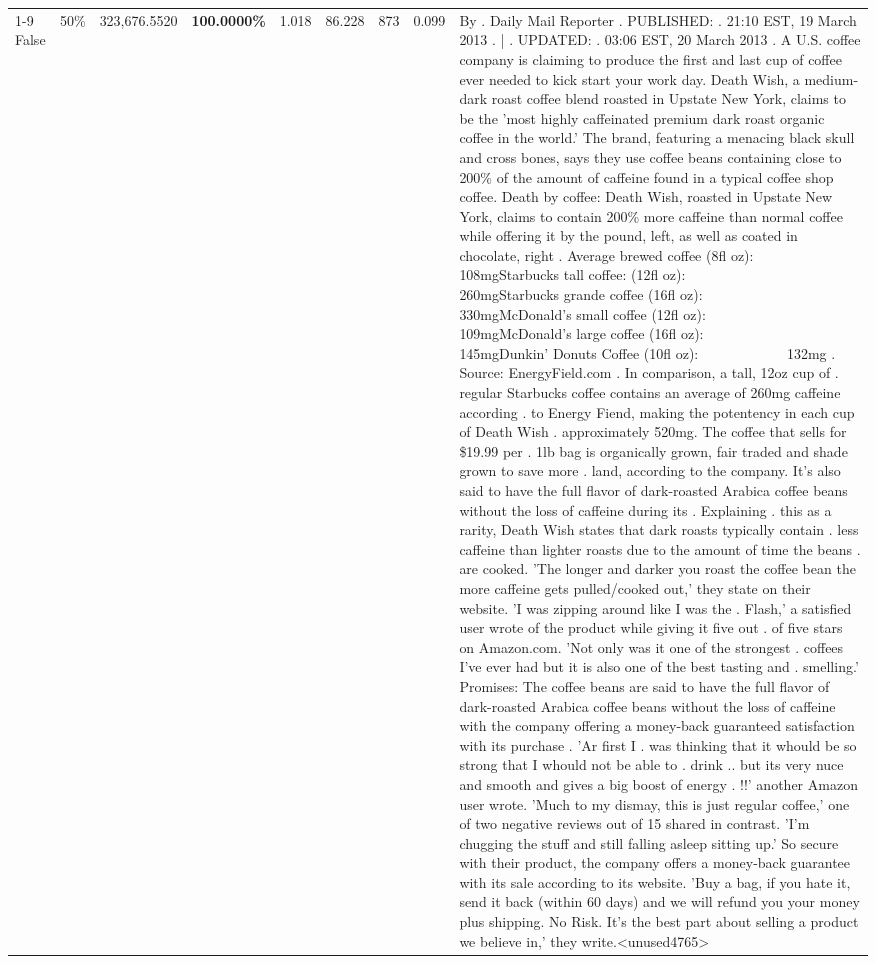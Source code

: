 \begin{table}[H]
{\begin{tabular}{lllrlllll}
\cline{1-9} \cline{2-9}
False & 50\% & 323,676.5520 & \bfseries \color{red} 100.0000\% & 1.018 & 86.228 & 873 & 0.099 & By . Daily Mail Reporter . PUBLISHED: . 21:10 EST, 19 March 2013 . | . UPDATED: . 03:06 EST, 20 March 2013 . A U.S. coffee company is claiming to produce the first and last cup of coffee ever needed to kick start your work day. Death Wish, a medium-dark roast coffee blend roasted in Upstate New York, claims to be the 'most highly caffeinated premium dark roast organic coffee in the world.' The brand, featuring a menacing black skull and cross bones, says they use coffee beans containing close to 200\% of the amount of caffeine found in a typical coffee shop coffee. Death by coffee: Death Wish, roasted in Upstate New York, claims to contain 200\% more caffeine than normal coffee while offering it by the pound, left, as well as coated in chocolate, right . Average brewed coffee (8fl oz):              108mgStarbucks tall coffee: (12fl oz):                260mgStarbucks grande coffee (16fl oz):         330mgMcDonald's small coffee (12fl oz):           109mgMcDonald's large coffee (16fl oz):           145mgDunkin' Donuts Coffee (10fl oz):             132mg . Source: EnergyField.com . In comparison, a tall, 12oz cup of . regular Starbucks coffee contains an average of 260mg caffeine according . to Energy Fiend, making the potentency in each cup of Death Wish . approximately 520mg. The coffee that sells for \$19.99 per . 1lb bag is organically grown, fair traded and shade grown to save more . land, according to the company. It's also said to have the full flavor of dark-roasted Arabica coffee beans without the loss of caffeine during its . Explaining . this as a rarity, Death Wish states that dark roasts typically contain . less caffeine than lighter roasts due to the amount of time the beans . are cooked. 'The longer and darker you roast the coffee bean the more caffeine gets pulled/cooked out,' they state on their website. 'I was zipping around like I was the . Flash,' a satisfied user wrote of the product while giving it five out . of five stars on Amazon.com. 'Not only was it one of the strongest . coffees I've ever had but it is also one of the best tasting and . smelling.’ Promises: The coffee beans are said to have the full flavor of dark-roasted Arabica coffee beans without the loss of caffeine with the company offering a money-back guaranteed satisfaction with its purchase . 'Ar first I . was thinking that it whould be so strong that I whould not be able to . drink .. but its very nuce and smooth and gives a big boost of energy . !!' another Amazon user wrote. 'Much to my dismay, this is just regular coffee,' one of two negative reviews out of 15 shared in contrast. 'I'm chugging the stuff and still falling asleep sitting up.' So secure with their product, the company offers a money-back guarantee with its sale according to its website. 'Buy a bag, if you hate it, send it back (within 60 days) and we will refund you your money plus shipping. No Risk. It’s the best part about selling a product we believe in,' they write.<unused4765> \\

\end{tabular}}
\end{table}
